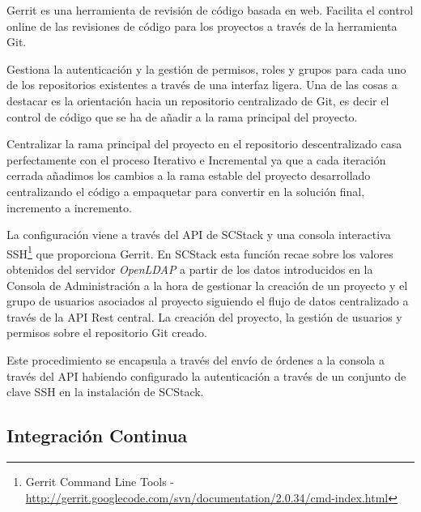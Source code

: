 \par Gerrit es una herramienta de revisión de código basada en web. Facilita el control online de las revisiones de código para los proyectos a través de la herramienta Git.

\par Gestiona la autenticación y la gestión de permisos, roles y grupos para cada uno de los repositorios existentes a través de una interfaz ligera. Una de las cosas a destacar es la orientación hacia un repositorio centralizado de Git, es decir el control de código que se ha de añadir a la rama principal del proyecto.

\par Centralizar la rama principal del proyecto en el repositorio descentralizado casa perfectamente con el proceso Iterativo e Incremental ya que a cada iteración cerrada añadimos los cambios a la rama estable del proyecto desarrollado centralizando el código a empaquetar para convertir en la solución final, incremento a incremento.

\par La configuración viene a través del API de SCStack y una consola interactiva SSH\footnote{Gerrit Command Line Tools - \url{http://gerrit.googlecode.com/svn/documentation/2.0.34/cmd-index.html}} que proporciona Gerrit. En SCStack esta función recae sobre los valores obtenidos del servidor \emph{OpenLDAP} a partir de los datos introducidos en la Consola de Administración a la hora de gestionar la creación de un proyecto y el grupo de usuarios asociados al proyecto siguiendo el flujo de datos centralizado a través de la API Rest central. La creación del proyecto, la gestión de usuarios y permisos sobre el repositorio Git creado.

\par Este procedimiento se encapsula a través del envío de órdenes a la consola a través del API habiendo configurado la autenticación a través de un conjunto de clave SSH en la instalación de SCStack.



\subsection{Integración Continua}
\label{sub:ci-jenkins}

